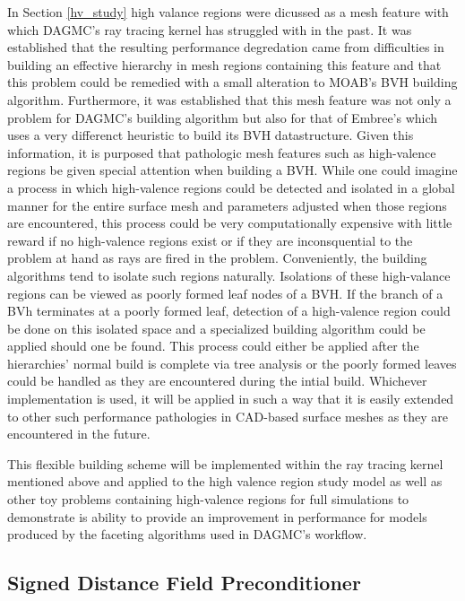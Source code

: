 \documentclass[12pt, a4paper]{article}
\begin{document}
In Section \ref{hv_study} high valance regions were dicussed as a mesh feature with which DAGMC's ray tracing kernel has struggled with in the past. It was established that the resulting performance degredation came from difficulties in building an effective hierarchy in mesh regions containing this feature and that this problem could be remedied with a small alteration to MOAB's BVH building algorithm. Furthermore, it was established that this mesh feature was not only a problem for DAGMC's building algorithm but also for that of Embree's which uses a very differenct heuristic to build its BVH datastructure. Given this information, it is purposed that pathologic mesh features such as high-valence regions be given special attention when building a BVH. While one could imagine a process in which high-valence regions could be detected and isolated in a global manner for the entire surface mesh and parameters adjusted when those regions are encountered, this process could be very computationally expensive with little reward if no high-valence regions exist or if they are inconsquential to the problem at hand as rays are fired in the problem. Conveniently, the building algorithms tend to isolate such regions naturally. Isolations of these high-valance regions can be viewed as poorly formed leaf nodes of a BVH. If the branch of a BVh terminates at a poorly formed leaf, detection of a high-valence region could be done on this isolated space and a specialized building algorithm could be applied should one be found. This process could either be applied after the hierarchies' normal build is complete via tree analysis or the poorly formed leaves could be handled as they are encountered during the intial build. Whichever implementation is used, it will be applied in such a way that it is easily extended to other such performance pathologies in CAD-based surface meshes as they are encountered in the future.

This flexible building scheme will be implemented within the ray tracing kernel mentioned above and applied to the high valence region study model as well as other toy problems containing high-valence regions for full simulations to demonstrate is ability to provide an improvement in performance for models produced by the faceting algorithms used in DAGMC's workflow. 

\subsection{Signed Distance Field Preconditioner}
\end{document}
